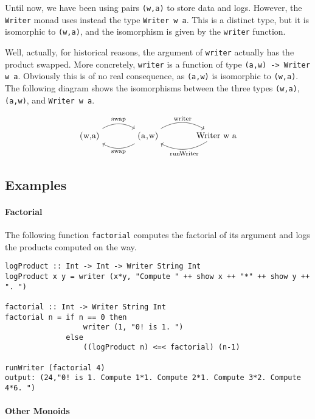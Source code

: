 \documentclass[11pt]{article}
\theoremstyle{nonumberplain}
\newcommand*\lsin{\lstinline}
\newcommand*\lsmath[1]{\text{\lstinline|#1|}}
\begin{document}
Until now, we have been using pairs \lsin|(w,a)| to store data and logs. However, the \lsin|Writer| monad uses instead the type \lsin|Writer w a|. This is a distinct type, but it is isomorphic to \lsin|(w,a)|, and the isomorphism is given by the \lsin|writer| function.

Well, actually, for historical reasons, the argument of \lsin|writer| actually has the product swapped. More concretely, \lsin|writer| is a function of type \lsin|(a,w) -> Writer w a|. Obviously this is of no real consequence, as \lsin|(a,w)| is isomorphic to \lsin|(w,a)|. The following diagram shows the isomorphisms between the three types \lsin|(w,a)|, \lsin|(a,w)|, and \lsin|Writer w a|.

\begin{equation}
\begin{tikzcd}[column sep = large]
\lsmath{(w,a)} \arrow[r, bend left, "\lsmath{swap}"] & \arrow[l, bend left, "\lsmath{swap}"] \lsmath{(a,w)} \arrow[r, bend left, "\lsmath{writer}"] & \lsmath{Writer w a} \arrow[l, bend left, "\lsmath{runWriter}"]
\end{tikzcd}
\end{equation}

\subsection{Examples}

\paragraph{Factorial}
The following function \lsin|factorial| computes the factorial of its argument and logs the products computed on the way.

\begin{lstlisting}
logProduct :: Int -> Int -> Writer String Int
logProduct x y = writer (x*y, "Compute " ++ show x ++ "*" ++ show y ++ ". ")

factorial :: Int -> Writer String Int
factorial n = if n == 0 then
                  writer (1, "0! is 1. ") 
              else
                  ((logProduct n) <=< factorial) (n-1)

runWriter (factorial 4)
output: (24,"0! is 1. Compute 1*1. Compute 2*1. Compute 3*2. Compute 4*6. ")
\end{lstlisting}

\paragraph{Other Monoids}
\end{document}

